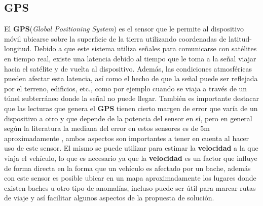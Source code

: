 	\subsection{GPS}
		El \textbf{GPS}(\emph{Global Positioning System}) es el sensor que le permite al dispositivo móvil ubicarse sobre la
		superficie de la tierra utilizando coordenadas de latitud-longitud. Debido a que este sistema utiliza señales para
		comunicarse con satélites en tiempo real, existe una latencia debido al tiempo que le toma a la señal viajar hacia el
		satélite y de vuelta al dispositivo. Además, las condiciones atmosféricas pueden afectar esta latencia, así como el hecho
		de que la señal puede ser reflejada por el terreno, edificios, etc., como por ejemplo cuando se viaja a través de un
		túnel subterráneo donde la señal no puede llegar. También es importante destacar que las lecturas que genera el \textbf
		{GPS} tienen cierto margen de error que varía de un dispositivo a otro y que depende de la potencia del sensor en sí,
		pero en general según la literatura la mediana del error en estos sensores es de 5m aproximadamente \parencite{eriksson2008pothole},
		ambos aspectos son importantes a tener en cuenta al hacer uso de este sensor. El mismo se puede utilizar para estimar la
		\textbf{velocidad} a la que viaja el vehículo, lo que es necesario ya que la \textbf{velocidad} es un factor que influye de
		forma directa en la forma que un vehículo es afectado por un bache, además con este sensor es posible ubicar en un mapa
		aproximadamente los lugares donde existen baches u otro tipo de anomalías, incluso puede ser útil para marcar rutas de viaje
		y así facilitar algunos aspectos de la propuesta de solución.

